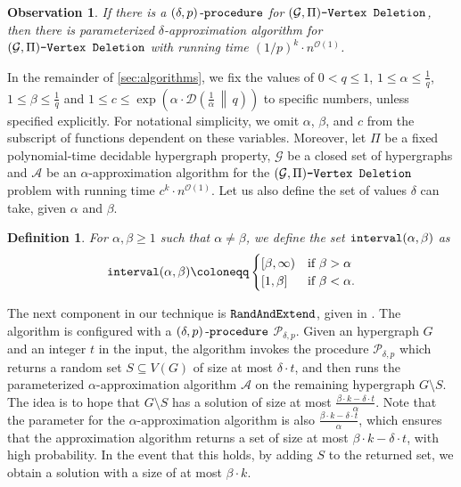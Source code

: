 \documentclass[letterpaper,11pt]{article}
\newcommand{\1}[1]{\mathds{1}\left[#1\right]}
\newcommand{\A}{{\mathcal{A}}}
\newcommand{\randext}{\textnormal{\texttt{RandAndExtend}}}
\newcommand{\D}[2]{\mathcal{D}\left(#1\, \middle\|\,#2 \right)}
\newcommand{\Oh}{\mathcal{O}}
\newcommand{\goodd}{\textnormal{\texttt{interval}}(\alpha, \beta)}
\newcommand{\proc}[2]{\left( #1, #2 \right)\textnormal{-\texttt{procedure}}}
\newcommand{\procalg}[2]{\mathcal{P}_{#1,#2}}
\newtheorem{definition}[theorem]{Definition}
\newtheorem{observation}[theorem]{Observation}
\newcommand{\gpivd}[1][\mathcal{G},\Pi]{(#1)\textnormal{\texttt{-Vertex Deletion}}}
\begin{document}
\begin{observation}\label{observation:proc_to_approx}
	If  there is a $\proc{\delta}{p}$ for  $\gpivd$, then there is  parameterized $\delta$-approximation algorithm 
	for $\gpivd$  with
	running time $(1 / p)^{k} \cdot n^{\Oh(1)}$.
\end{observation}

In the remainder of \cref{sec:algorithms}, we fix the values of $0 < q \leq 1$, $1 \leq \alpha \leq \frac{1}{q}$, $1 \leq \beta \leq \frac{1}{q}$ and
$1 \leq c \leq \exp\left( \alpha \cdot \D{\frac{1}{\alpha}}{q} \right)$ to specific numbers,
unless specified explicitly.
For notational simplicity, we omit $\alpha$, $\beta$, and $c$ from the subscript of functions dependent on these variables.
Moreover, let $\Pi$ be a fixed polynomial-time decidable hypergraph property, $\mathcal{G}$ be a closed set of hypergraphs
and $\A$ be an $\alpha$-approximation algorithm for the $\gpivd$ problem with running time $c^{k} \cdot n^{\Oh(1)}$.
Let us also define the set of values $\delta$ can take, given $\alpha$ and $\beta$.
\begin{definition}\label{definition:good_set}
	For $\alpha, \beta \geq 1$ such that $\alpha \neq \beta$, we define the set $\goodd$ as
	\begin{equation*}
		\goodd \coloneqq \begin{cases}
			[ \beta, \infty ) &\text{if } \beta > \alpha\\
			[1,\beta] &\text{if } \beta < \alpha.\\			
		\end{cases}
	\end{equation*}
\end{definition}


The next component in our technique is $\randext$, given in . The algorithm is configured with  a $\proc{\delta}{p}$ $\procalg{\delta}{p}$.  Given an hypergraph $G$
and an integer $t$ in the input, the algorithm  invokes the procedure $\procalg{\delta}{p}$ which returns a random set
$S \subseteq V(G)$ of size at most $\delta \cdot t$,
and then runs the parameterized $\alpha$-approximation algorithm $\A$  on the remaining hypergraph $G \setminus S$.
The idea is to hope that $G \setminus S$ has a solution of size at most $\frac{\beta \cdot k - \delta \cdot t}{\alpha}$.
Note that the parameter for the $\alpha$-approximation algorithm is also $\frac{\beta \cdot k - \delta \cdot t}{\alpha}$,
which ensures that the approximation algorithm returns a set of size at most $\beta \cdot k - \delta \cdot t$,
with high probability.
In the event that this holds, by adding $S$ to the returned set, we obtain a solution with a size of at most $\beta \cdot  k$.
\end{document}
